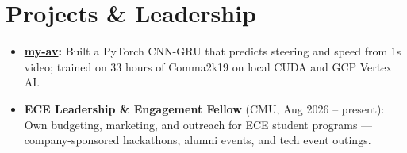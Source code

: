 \documentclass[11pt, letterpaper]{article}
\begin{document}
\section{Projects \& Leadership}
\begin{itemize}
  \item \textbf{\href{https://github.com/lordphone/my-av}{my-av}:} Built a PyTorch CNN-GRU that predicts steering and speed from 1s video; trained on 33 hours of Comma2k19 on local CUDA and GCP Vertex AI.
  \item \textbf{ECE Leadership \& Engagement Fellow} (CMU, Aug 2026 -- present): Own budgeting, marketing, and outreach for ECE student programs --- company-sponsored hackathons, alumni events, and tech event outings.
\end{itemize}
\end{document}
